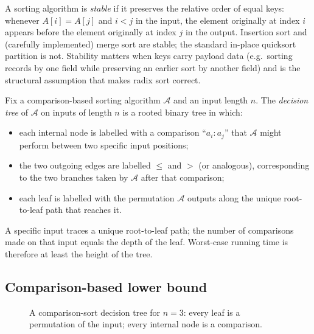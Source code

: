 \begin{definition}
\label{def:stable_sort}
A sorting algorithm is \emph{stable} if it preserves the relative order of equal keys: whenever $A[i] = A[j]$ and $i < j$ in the input, the element originally at index $i$ appears before the element originally at index $j$ in the output. Insertion sort and (carefully implemented) merge sort are stable; the standard in-place quicksort partition is not. Stability matters when keys carry payload data (e.g.\ sorting records by one field while preserving an earlier sort by another field) and is the structural assumption that makes radix sort correct.
\end{definition}

\begin{definition}
\label{def:decision_tree}
Fix a comparison-based sorting algorithm $\mathcal{A}$ and an input length $n$. The \emph{decision tree} of $\mathcal{A}$ on inputs of length $n$ is a rooted binary tree in which:
\begin{itemize}
  \item each internal node is labelled with a comparison ``$a_i\!:\!a_j$'' that $\mathcal{A}$ might perform between two specific input positions;
  \item the two outgoing edges are labelled $\le$ and $>$ (or analogous), corresponding to the two branches taken by $\mathcal{A}$ after that comparison;
  \item each leaf is labelled with the permutation $\mathcal{A}$ outputs along the unique root-to-leaf path that reaches it.
\end{itemize}
A specific input traces a unique root-to-leaf path; the number of comparisons made on that input equals the depth of the leaf. Worst-case running time is therefore at least the height of the tree.
\end{definition}

\subsection{Comparison-based lower bound}

\begin{figure}[h]
  \centering
  
  \caption{A comparison-sort decision tree for $n=3$: every leaf is a permutation of the input; every internal node is a comparison.}
  \label{fig:decision_tree}
\end{figure}

